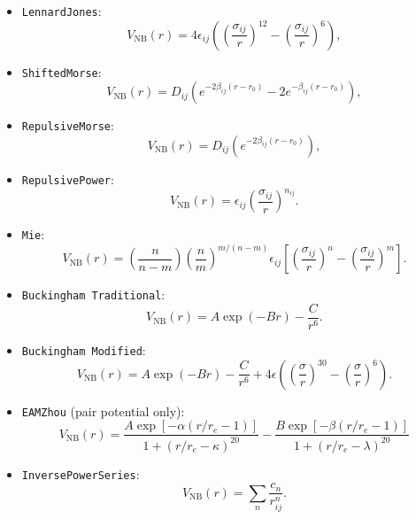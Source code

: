 \documentclass[letterpaper]{report}
\begin{document}
\begin{itemize}
\item {\tt LennardJones}:
\begin{equation*}
V_{\text{NB}}(r) = 4 \epsilon_{ij} \left(
  \left(\frac{\sigma_{ij}}{r} \right)^{12} -
  \left(\frac{\sigma_{ij}}{r} \right)^{6} \right),
\end{equation*}
\item {\tt ShiftedMorse}:
\begin{equation*}
 V_{\text{NB}}(r) = D_{ij} \left( e^{-2 \beta_{ij} (r -
     r_0)} - 2 e^{- \beta_{ij} (r -
     r_0)} \right),
\end{equation*}
\item {\tt RepulsiveMorse}:
\begin{equation*}
 V_{\text{NB}}(r) = D_{ij} \left( e^{-2 \beta_{ij} (r -
     r_0)} \right),
\end{equation*}
\item {\tt RepulsivePower}:
\begin{equation*}
  V_{\text{NB}}(r) = \epsilon_{ij}
  \left(\frac{\sigma_{ij}}{r} \right)^{n_{ij}}.
\end{equation*}
\item {\tt Mie}:
\begin{equation*}
  V_{\text{NB}}(r) =  \left(\frac{n}{n-m}\right)
  \left(\frac{n}{m}\right)^{m/(n-m)} \epsilon_{ij} \left[
  \left(\frac{\sigma_{ij}}{r} \right)^{n} -
  \left(\frac{\sigma_{ij}}{r} \right)^{m} \right].
\end{equation*}
\item {\tt Buckingham Traditional}:
\begin{equation*}
  V_{\text{NB}}(r) =  A \exp( -B r) - \frac{C}{r^6}.
\end{equation*}
\item {\tt Buckingham Modified}:
\begin{equation*}
  V_{\text{NB}}(r) = A \exp( -B r) - \frac{C}{r^6} + 4 \epsilon \left( \left( \frac{\sigma}{r} \right)^{30} - \left( \frac{\sigma}{r} \right)^6 \right).
\end{equation*}
\item {\tt EAMZhou} (pair potential only):
\begin{equation*}
  V_{\text{NB}}(r) = \frac{ A \exp\left[-\alpha (r/r_e -1)\right]}{1+(r/r_e - \kappa)^{20}} -  \frac{ B \exp\left[-\beta (r/r_e -1)\right]}{1+(r/r_e - \lambda)^{20}}
\end{equation*}
\item {\tt InversePowerSeries}:
\begin{equation*}
  V_{\text{NB}}(r) = \sum_{n} \frac{ c_n }{ r_{ij}^n}.
\end{equation*}

\end{itemize}
\end{document}
